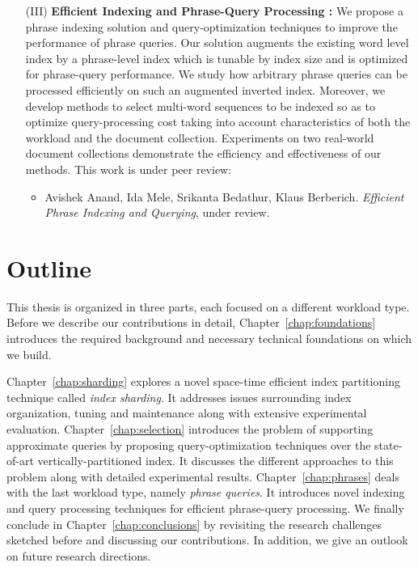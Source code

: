 \begin{enumerate}
\item[(III)] \textbf{Efficient Indexing and Phrase-Query Processing : }We propose a phrase indexing solution and query-optimization techniques to improve the performance of phrase queries. Our solution augments the existing word level index by a phrase-level index which is tunable by index size and is optimized for phrase-query performance. We study how arbitrary phrase queries can be processed efficiently on such an augmented inverted index. Moreover, we develop methods to select multi-word sequences to be indexed so as to optimize query-processing cost taking into account characteristics of both the workload and the document collection. Experiments on two real-world document collections demonstrate the efficiency and effectiveness of our methods. This work is under peer review:

\begin{itemize}
	\item{} 
		Avishek Anand, Ida Mele, Srikanta Bedathur, Klaus Berberich.
		\emph{Efficient Phrase Indexing and Querying}, 
		under review.
\end{itemize}


\end{enumerate}

\section{Outline}
\label{sec:outline}
This thesis is organized in three parts, each focused on a different workload type. Before we describe our contributions in detail, Chapter~\ref{chap:foundations} introduces the required background and necessary technical foundations on which we build.

Chapter~\ref{chap:sharding} explores a novel space-time efficient index partitioning technique called \emph{index sharding}. It addresses issues surrounding index organization, tuning and maintenance along with extensive experimental evaluation. Chapter~\ref{chap:selection} introduces the problem of supporting approximate queries by proposing query-optimization techniques over the state-of-art vertically-partitioned index. It discusses the different approaches to this problem along with detailed experimental results. Chapter~\ref{chap:phrases} deals with the last workload type, namely \emph{phrase queries}. It introduces novel indexing and query processing techniques for efficient phrase-query processing. We finally conclude in Chapter~\ref{chap:conclusions} by revisiting the research challenges sketched before and discussing our contributions. In addition, we give an outlook on future research directions.
